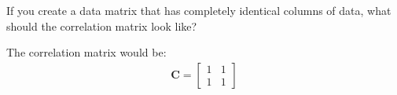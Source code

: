 If you create a data matrix that has completely identical columns of data, what should the correlation matrix look like?

\begin{solution}
    The correlation matrix would be:
    \begin{align*}
        \boldsymbol{C} = \begin{bmatrix}
            1 & 1 \\
            1 & 1
        \end{bmatrix}
    \end{align*}
\end{solution}
